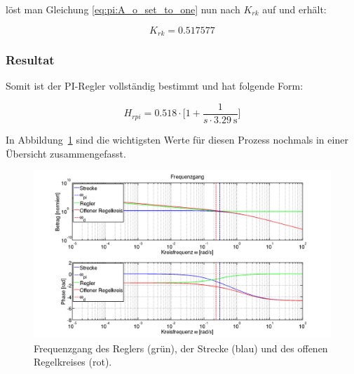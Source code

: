 l\"ost  man Gleichung  \ref{eq:pi:A_o_set_to_one}  nun nach  $K_{rk}$ auf  und
erh\"alt:

\begin{equation} \label{eq:pi:k_rk_result}
    K_{rk} = 0.517577
\end{equation}


\clearpage
\subsubsection{Resultat}

Somit ist der PI-Regler vollst\"andig bestimmt und hat folgende Form:

\begin{equation} \label{eq:pi:result}
    H_{rpi} = 0.518 \cdot \biggl[ 1 + \frac{1}{s \cdot \SI{3.29}{\second}} \biggr]
\end{equation}

In Abbildung~\ref{fig:pi:all} sind die  wichtigsten Werte f\"ur diesen Prozess
nochmals in einer \"Ubersicht zusammengefasst.

\begin{figure}[h! width=\pagewidth]
    \includegraphics[width=\textwidth]{images/piBode.png}
    \caption{%
        Frequenzgang des Reglers (gr\"un), der  Strecke (blau) und des offenen
        Regelkreises (rot).
    }
    \label{fig:pi:all}
\end{figure}
